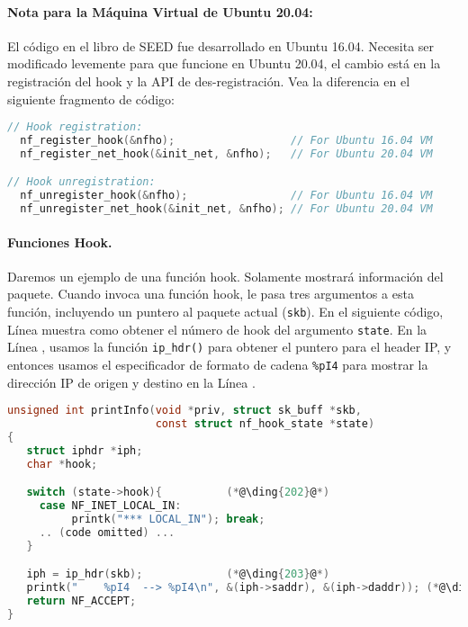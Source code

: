 \paragraph{Nota para la Máquina Virtual de Ubuntu 20.04:}
El código en el libro de SEED fue desarrollado en Ubuntu 16.04. Necesita ser modificado levemente para que funcione en Ubuntu 20.04, el cambio está en la registración del hook y la API de des-registración. Vea la diferencia en el siguiente fragmento de código:


\begin{lstlisting}[language=C]
// Hook registration:
  nf_register_hook(&nfho);                  // For Ubuntu 16.04 VM
  nf_register_net_hook(&init_net, &nfho);   // For Ubuntu 20.04 VM

// Hook unregistration:
  nf_unregister_hook(&nfho);                // For Ubuntu 16.04 VM
  nf_unregister_net_hook(&init_net, &nfho); // For Ubuntu 20.04 VM
\end{lstlisting}
 

\paragraph{Funciones Hook.} Daremos un ejemplo de una función hook. Solamente mostrará información del paquete.
Cuando \netfilter invoca una función hook, le pasa tres argumentos a esta función, incluyendo un puntero al paquete actual (\texttt{skb}). 
En el siguiente código, Línea  muestra como obtener el número de hook del argumento \texttt{state}.
En la Línea , usamos la función \texttt{ip\_hdr()} para obtener el puntero para el header IP, y entonces usamos el especificador de formato de cadena \texttt{\%pI4} para mostrar la dirección IP de origen y destino en la Línea .

\begin{lstlisting}[language=C, caption={An example of hook function}]
unsigned int printInfo(void *priv, struct sk_buff *skb,   
                       const struct nf_hook_state *state)
{
   struct iphdr *iph;
   char *hook;

   switch (state->hook){          (*@\ding{202}@*)
     case NF_INET_LOCAL_IN: 
          printk("*** LOCAL_IN"); break;
     .. (code omitted) ...
   }

   iph = ip_hdr(skb);             (*@\ding{203}@*)           
   printk("    %pI4  --> %pI4\n", &(iph->saddr), &(iph->daddr)); (*@\ding{204}@*)
   return NF_ACCEPT;
}
\end{lstlisting}

